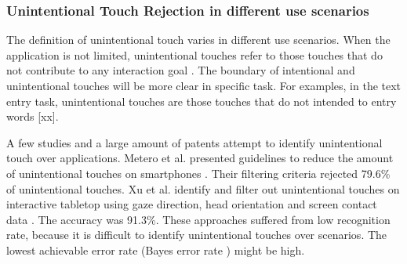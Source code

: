 \subsubsection{Unintentional Touch Rejection in different use scenarios}

The definition of unintentional touch varies in different use scenarios. When the application is not limited, unintentional touches refer to those touches that do not contribute to any interaction goal \cite{2020-TabletopTouch}. The boundary of intentional and unintentional touches will be more clear in specific task. For examples, in the text entry task, unintentional touches are those touches that do not intended to entry words [xx].

A few studies \cite{2012-IdentifyUnint,2020-TabletopTouch} and a large amount of patents \cite{2016-Classification,2006-PadUnint,2013-System,2013-Precluding,2015-TouchScreen} attempt to identify unintentional touch over applications. Metero et al. presented guidelines to reduce the amount of unintentional touches on smartphones \cite{2012-IdentifyUnint}. Their filtering criteria rejected 79.6\% of unintentional touches. Xu et al. identify and filter out unintentional touches on interactive tabletop using gaze direction, head orientation and screen contact data \cite{2020-TabletopTouch}. The accuracy was 91.3\%. These approaches suffered from low recognition rate, because it is difficult to identify unintentional touches over scenarios. The lowest achievable error rate (Bayes error rate \cite{tumer1996estimating}) might be high.

